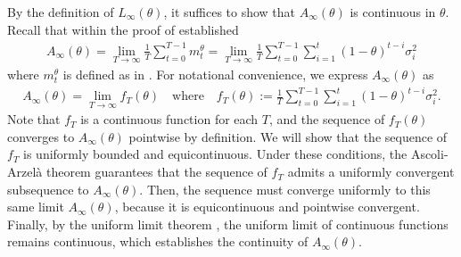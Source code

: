 \documentclass[a4paper, 11pt]{article}
\theoremstyle{definition}
\begin{document}
By the definition of $L_\infty(\theta)$, it suffices to show that $A_\infty(\theta)$ is continuous in $\theta$.
Recall that  within the proof of  established
\begin{align}
    A_\infty(\theta) = \lim_{T \to \infty} \frac{1}{T} \sum_{t=0}^{T-1} m_t^\theta = \lim_{T \to \infty} \frac{1}{T} \sum_{t=0}^{T-1} \sum_{i=1}^{t} (1 - \theta)^{t-i} \sigma_i^2 
\end{align}
where $m_t^\theta$ is defined as in .
For notational convenience, we express $A_\infty(\theta)$ as
\begin{align}
	A_\infty(\theta) = \lim_{T \to \infty} f_T(\theta) \quad \text{where} \quad f_T(\theta) := \frac{1}{T} \sum_{t=0}^{T-1} \sum_{i=1}^{t} (1 - \theta)^{t-i} \sigma_i^2 .
\end{align}
Note that $f_T$ is a continuous function for each $T$, and the sequence of $f_T(\theta)$ converges to $A_\infty(\theta)$ pointwise by definition.
We will show that the sequence of $f_T$ is uniformly bounded and equicontinuous. 
Under these conditions, the Ascoli-Arzel\`{a} theorem \citep[e.g.,][]{Rudin1976} guarantees that the sequence of $f_T$ admits a uniformly convergent subsequence to $A_\infty(\theta)$.
Then, the sequence must converge uniformly to this same limit $A_\infty(\theta)$, because it is equicontinuous and pointwise convergent.
Finally, by the uniform limit theorem \citep[e.g.,][]{Rudin1976}, the uniform limit of continuous functions remains continuous, which establishes the continuity of $A_\infty(\theta)$.
\end{document}
